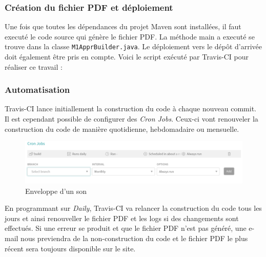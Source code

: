 \subsubsection*{Création du fichier PDF et déploiement}
Une fois que toutes les dépendances du projet Maven sont installées, il faut executé le code source qui génère le fichier PDF. La méthode main a executé se trouve dans la classe \texttt{M1ApprBuilder.java}. Le déploiement vers le dépôt d'arrivée doit également être pris en compte. Voici le script exécuté par Travis-CI pour réaliser ce travail :


\subsubsection*{Automatisation}
Travis-CI lance initiallement la construction du code à chaque nouveau commit. Il est cependant possible de configurer des \textit{Cron Jobs}. Ceux-ci vont renouveler la construction du code de manière quotidienne, hebdomadaire ou mensuelle. 

\begin{figure}[!h]
    \begin{center}
    \includegraphics[width=13cm]{assets/CronJobs.PNG}
    \end{center}
    \caption{Enveloppe d'un son}
\end{figure}

En programmant sur \textit{Daily}, Travis-CI va relancer la construction du code tous les jours et ainsi renouveller le fichier PDF et les logs si des changements sont effectués. Si une erreur se produit et que le fichier PDF n'est pas généré, une e-mail nous previendra de la non-construction du code et le fichier PDF le plus récent sera toujours disponible sur le site.